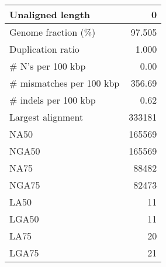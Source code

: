 \documentclass[12pt,a4paper]{article}
\begin{document}
\begin{table}[ht]
\begin{center}
\begin{tabular}{|l*{1}{|r}|}
Unaligned length & 0 \\ \hline
Genome fraction (\%) & 97.505 \\ \hline
Duplication ratio & 1.000 \\ \hline
\# N's per 100 kbp & 0.00 \\ \hline
\# mismatches per 100 kbp & 356.69 \\ \hline
\# indels per 100 kbp & 0.62 \\ \hline
Largest alignment & 333181 \\ \hline
NA50 & 165569 \\ \hline
NGA50 & 165569 \\ \hline
NA75 & 88482 \\ \hline
NGA75 & 82473 \\ \hline
LA50 & 11 \\ \hline
LGA50 & 11 \\ \hline
LA75 & 20 \\ \hline
LGA75 & 21 \\ \hline
\end{tabular}
\end{center}
\end{table}
\end{document}
